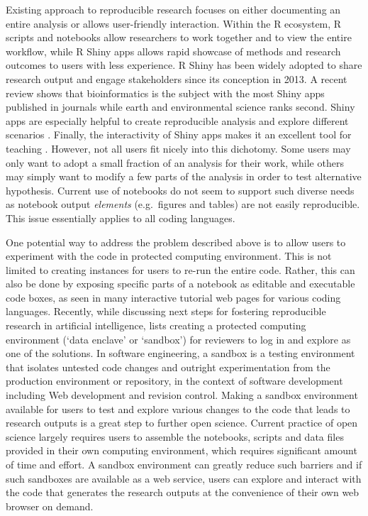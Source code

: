 Existing approach to reproducible research focuses on either documenting
an entire analysis or allows user-friendly interaction. Within the R
ecosystem, R scripts and notebooks allow researchers to work together
and to view the entire workflow, while R Shiny apps \citep{shiny} allows
rapid showcase of methods and research outcomes to users with less
experience. R Shiny has been widely adopted to share research output and
engage stakeholders since its conception in 2013. A recent review
\citep{Kasprzak} shows that bioinformatics is the subject with the most
Shiny apps published in journals while earth and environmental science
ranks second. Shiny apps are especially helpful to create reproducible
analysis \citep[e.g.~examples in][]{Hollaway2020} and explore different
scenarios \citep[e.g.][]{Whateley2015, Mose2018}. Finally, the
interactivity of Shiny apps makes it an excellent tool for teaching
\citep[e.g.][]{Williams2017, adventr}. However, not all users fit nicely
into this dichotomy. Some users may only want to adopt a small fraction
of an analysis for their work, while others may simply want to modify a
few parts of the analysis in order to test alternative hypothesis.
Current use of notebooks do not seem to support such diverse needs as
notebook output \textit{elements} (e.g.~figures and tables) are not
easily reproducible. This issue essentially applies to all coding
languages.

One potential way to address the problem described above is to allow
users to experiment with the code in protected computing environment.
This is not limited to creating instances for users to re-run the entire
code. Rather, this can also be done by exposing specific parts of a
notebook as editable and executable code boxes, as seen in many
interactive tutorial web pages for various coding languages. Recently,
while discussing next steps for fostering reproducible research in
artificial intelligence, \citet{Carter2019} lists creating a protected
computing environment (`data enclave' or `sandbox') for reviewers to log
in and explore as one of the solutions. In software engineering, a
sandbox is a testing environment that isolates untested code changes and
outright experimentation from the production environment or repository,
in the context of software development including Web development and
revision control. Making a sandbox environment available for users to
test and explore various changes to the code that leads to research
outputs is a great step to further open science. Current practice of
open science largely requires users to assemble the notebooks, scripts
and data files provided in their own computing environment, which
requires significant amount of time and effort. A sandbox environment
can greatly reduce such barriers and if such sandboxes are available as
a web service, users can explore and interact with the code that
generates the research outputs at the convenience of their own web
browser on demand.

